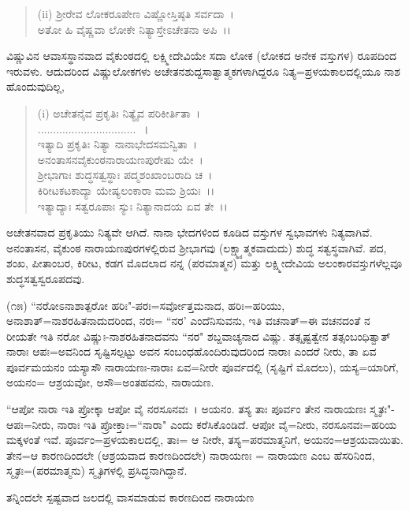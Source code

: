 \begin{verse}
(ii) ಶ‍್ರೀರೇವ ಲೋಕರೂಪೇಣ ವಿಷ್ಣೋಸ್ತಿಷ್ಠತಿ ಸರ್ವದಾ~।\\ ಅತೋ ಹಿ ವೈಷ್ಣವಾ ಲೋಕೇ ನಿತ್ಯಾಸ್ತೇಽಚೇತನಾ ಅಪಿ~।।
\end{verse}


ವಿಷ್ಣುವಿನ ಆವಾಸಸ್ಥಾನವಾದ ವೈಕುಂಠದಲ್ಲಿ ಲಕ್ಷ್ಮೀದೇವಿಯೇ ಸದಾ ಲೋಕ (ಲೋಕದ ಅನೇಕ ವಸ್ತುಗಳ) ರೂಪದಿಂದ ಇರುವಳು. ಆದುದರಿಂದ ವಿಷ್ಣುಲೋಕಗಳು ಅಚೇತನಶುದ್ದಸಾತ್ವಾತ್ಮಕಗಳಾಗಿದ್ದರೂ ನಿತ್ಯ=ಪ್ರಳಯಕಾಲದಲ್ಲಿಯೂ ನಾಶ ಹೊಂದುವುದಿಲ್ಲ,

\begin{verse}
(i) ಅಚೇತನೈವ ಪ್ರಕೃತಿಃ ನಿತ್ಯೈವ ಪರಿಕೀರ್ತಿತಾ~।\\................................~।\\ ಇತ್ಯಾದಿ ಪ್ರಕೃತಿಃ ನಿತ್ಯಾ ನಾನಾಭೇದಸಮನ್ವಿತಾ~।\\ ಅನಂತಾಸನವೈಕುಂಠನಾರಾಯಣಪುರೇಷು ಯೇ~।\\ ಶ‍್ರೀಭಾಗಾಃ ಶುದ್ಧಸತ್ವಸ್ಥಾಃ ಪದ್ಮಶಂಖಾಂಬರಾದಿ ಚ~।\\ ಕಿರೀಟಕಟಕಾದ್ಯಾ ಯೇಷ್ಯಲಂಕಾರಾ ಮಮ ಶ್ರಿಯಃ~।।\\ ಇತ್ಯಾದ್ಯಾಃ ಸತ್ವರೂಪಾಃ ಸ್ಯುಃ ನಿತ್ಯಾನಾದಯ ಏವ ತೇ~।।
\end{verse}


\noindent
ಅಚೇತನವಾದ ಪ್ರಕೃತಿಯು ನಿತ್ಯವೇ ಆಗಿದೆ. ನಾನಾ ಭೇದಗಳಿಂದ ಕೂಡಿದ ವಸ್ತುಗಳ ಸ್ವಭಾವಗಳು ನಿತ್ಯವಾಗಿವೆ. ಅನಂತಾಸನ, ವೈಕುಂಠ ನಾರಾಯಣಪುರಗಳಲ್ಲಿರುವ ಶ‍್ರೀಭಾಗವು (ಲಕ್ಷ್ಮ್ಯಾತ್ಮಕವಾದುದು) ಶುದ್ಧ ಸತ್ವಸ್ಥವಾಗಿವೆ. ಪದ, ಶಂಖ, ಪೀತಾಂಬರ, ಕಿರೀಟ, ಕಡಗ ಮೊದಲಾದ ನನ್ನ (ಪರಮಾತ್ಮನ) ಮತ್ತು ಲಕ್ಷ್ಮೀದೇವಿಯ ಅಲಂಕಾರವಸ್ತುಗಳೆಲ್ಲವೂ ಶುದ್ಧಸತ್ವಸ್ವರೂಪದವು.

(೧೫) ``ನರೋಽನಾಶಾತ್ಪರೋ ಹರಿಃ"-ಪರಃ=ಸರ್ವೋತ್ತಮನಾದ, ಹರಿಃ=ಹರಿಯು, ಅನಾಶಾತ್=ನಾಶರಹಿತನಾದುದರಿಂದ, ನರಃ= ``ನರ' ಎಂದೆನಿಸುವನು, ಇತಿ ವಚನಾತ್=ಈ ವಚನದಂತೆ ನ ರೀಯತೇ ಇತಿ ನರೋ ವಿಷ್ಣುಃ-ನಾಶರಹಿತನಾದವನು ``ನರ" ಶಬ್ದವಾಚ್ಯನಾದ ವಿಷ್ಣು. ತತ್ಸೃಷ್ಟತ್ವೇನ ತತ್ಸಂಬಂಧಿತ್ವಾತ್ ನಾರಾಃ ಆಪಃ=ಅವನಿಂದ ಸೃಷ್ಟಿಸಲ್ಪಟ್ಟು ಅವನ ಸಂಬಂಧಹೊಂದಿರುವುದರಿಂದ ನಾರಾಃ ಎಂದರೆ ನೀರು, ತಾ ಏವ ಪೂರ್ವಮಯನಂ ಯಸ್ಯಾಸೌ ನಾರಾಯಣಃ-ನಾರಾಃ ಏವ=ನೀರೇ ಪೂರ್ವದಲ್ಲಿ (ಸೃಷ್ಟಿಗೆ ಮೊದಲು), ಯಸ್ಯ=ಯಾರಿಗೆ, ಅಯನಂ= ಆಶ್ರಯವೋ, ಅಸೌ=ಅಂತಹವನು, ನಾರಾಯಣ.

``ಆಪೋ ನಾರಾ ಇತಿ ಪ್ರೋಕ್ಕಾ ಆಪೋ ವೈ ನರಸೂನವಃ~। ಅಯನಂ. ತಸ್ಯ ತಾಃ ಪೂರ್ವಂ ತೇನ ನಾರಾಯಣಃ ಸ್ಮೃತಃ"-ಆಪಃ=ನೀರು, ನಾರಾಃ ಇತಿ ಪ್ರೋಕ್ತಾಃ=``ನಾರಾ" ಎಂದು ಕರೆಸಿಕೊಂಡಿದೆ. ಆಪೋ ವೈ=ನೀರು, ನರಸೂನವಃ=ಹರಿಯ ಮಕ್ಕಳಂತೆ ಇವೆ. ಪೂರ್ವಂ=ಪ್ರಳಯಕಾಲದಲ್ಲಿ, ತಾಃ= ಆ ನೀರೇ, ತಸ್ಯ=ಪರಮಾತ್ಮನಿಗೆ, ಅಯನಂ=ಆಶ್ರಯವಾಯಿತು. ತೇನ=ಆ ಕಾರಣದಿಂದಲೇ (ಆಶ್ರಯವಾದ ಕಾರಣದಿಂದಲೇ) ನಾರಾಯಣಃ = ನಾರಾಯಣ ಎಂಬ ಹೆಸರಿನಿಂದ, ಸ್ಮೃತಃ=(ಪರಮಾತ್ಮನು) ಸ್ಮೃತಿಗಳಲ್ಲಿ ಪ್ರಸಿದ್ಧನಾಗಿದ್ದಾನೆ.

\begin{center}
ತನ್ನಿಂದಲೇ ಸ್ಪಷ್ಟವಾದ ಜಲದಲ್ಲಿ ವಾಸಮಾಡುವ ಕಾರಣದಿಂದ ನಾರಾಯಣ
\end{center}

